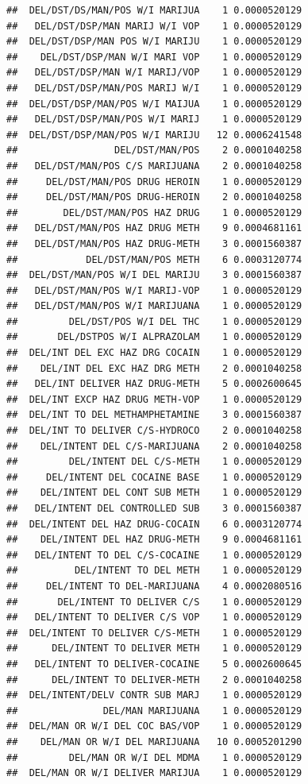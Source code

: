 \documentclass[]{book}
\begin{document}
\begin{verbatim}
##  DEL/DST/DS/MAN/POS W/I MARIJUA    1 0.0000520129
##   DEL/DST/DSP/MAN MARIJ W/I VOP    1 0.0000520129
##  DEL/DST/DSP/MAN POS W/I MARIJU    1 0.0000520129
##    DEL/DST/DSP/MAN W/I MARI VOP    1 0.0000520129
##   DEL/DST/DSP/MAN W/I MARIJ/VOP    1 0.0000520129
##   DEL/DST/DSP/MAN/POS MARIJ W/I    1 0.0000520129
##  DEL/DST/DSP/MAN/POS W/I MAIJUA    1 0.0000520129
##   DEL/DST/DSP/MAN/POS W/I MARIJ    1 0.0000520129
##  DEL/DST/DSP/MAN/POS W/I MARIJU   12 0.0006241548
##                 DEL/DST/MAN/POS    2 0.0001040258
##   DEL/DST/MAN/POS C/S MARIJUANA    2 0.0001040258
##     DEL/DST/MAN/POS DRUG HEROIN    1 0.0000520129
##     DEL/DST/MAN/POS DRUG-HEROIN    2 0.0001040258
##        DEL/DST/MAN/POS HAZ DRUG    1 0.0000520129
##   DEL/DST/MAN/POS HAZ DRUG METH    9 0.0004681161
##   DEL/DST/MAN/POS HAZ DRUG-METH    3 0.0001560387
##            DEL/DST/MAN/POS METH    6 0.0003120774
##  DEL/DST/MAN/POS W/I DEL MARIJU    3 0.0001560387
##   DEL/DST/MAN/POS W/I MARIJ-VOP    1 0.0000520129
##   DEL/DST/MAN/POS W/I MARIJUANA    1 0.0000520129
##         DEL/DST/POS W/I DEL THC    1 0.0000520129
##       DEL/DSTPOS W/I ALPRAZOLAM    1 0.0000520129
##  DEL/INT DEL EXC HAZ DRG COCAIN    1 0.0000520129
##    DEL/INT DEL EXC HAZ DRG METH    2 0.0001040258
##   DEL/INT DELIVER HAZ DRUG-METH    5 0.0002600645
##  DEL/INT EXCP HAZ DRUG METH-VOP    1 0.0000520129
##  DEL/INT TO DEL METHAMPHETAMINE    3 0.0001560387
##  DEL/INT TO DELIVER C/S-HYDROCO    2 0.0001040258
##    DEL/INTENT DEL C/S-MARIJUANA    2 0.0001040258
##         DEL/INTENT DEL C/S-METH    1 0.0000520129
##     DEL/INTENT DEL COCAINE BASE    1 0.0000520129
##    DEL/INTENT DEL CONT SUB METH    1 0.0000520129
##   DEL/INTENT DEL CONTROLLED SUB    3 0.0001560387
##  DEL/INTENT DEL HAZ DRUG-COCAIN    6 0.0003120774
##    DEL/INTENT DEL HAZ DRUG-METH    9 0.0004681161
##   DEL/INTENT TO DEL C/S-COCAINE    1 0.0000520129
##          DEL/INTENT TO DEL METH    1 0.0000520129
##     DEL/INTENT TO DEL-MARIJUANA    4 0.0002080516
##       DEL/INTENT TO DELIVER C/S    1 0.0000520129
##   DEL/INTENT TO DELIVER C/S VOP    1 0.0000520129
##  DEL/INTENT TO DELIVER C/S-METH    1 0.0000520129
##      DEL/INTENT TO DELIVER METH    1 0.0000520129
##   DEL/INTENT TO DELIVER-COCAINE    5 0.0002600645
##      DEL/INTENT TO DELIVER-METH    2 0.0001040258
##  DEL/INTENT/DELV CONTR SUB MARJ    1 0.0000520129
##               DEL/MAN MARIJUANA    1 0.0000520129
##  DEL/MAN OR W/I DEL COC BAS/VOP    1 0.0000520129
##    DEL/MAN OR W/I DEL MARIJUANA   10 0.0005201290
##         DEL/MAN OR W/I DEL MDMA    1 0.0000520129
##  DEL/MAN OR W/I DELIVER MARIJUA    1 0.0000520129

\end{verbatim}
\end{document}
